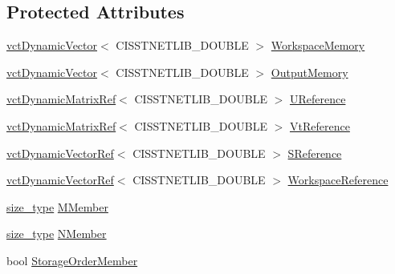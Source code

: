 \subsection*{Protected Attributes}
\begin{DoxyCompactItemize}
\item 
\hyperlink{classvct_dynamic_vector}{vct\+Dynamic\+Vector}$<$ C\+I\+S\+S\+T\+N\+E\+T\+L\+I\+B\+\_\+\+D\+O\+U\+B\+L\+E $>$ \hyperlink{classnmr_s_v_d_economy_dynamic_data_a7e195abf076d992a6c1d4a29ec76be91}{Workspace\+Memory}
\item 
\hyperlink{classvct_dynamic_vector}{vct\+Dynamic\+Vector}$<$ C\+I\+S\+S\+T\+N\+E\+T\+L\+I\+B\+\_\+\+D\+O\+U\+B\+L\+E $>$ \hyperlink{classnmr_s_v_d_economy_dynamic_data_ad990316888e2acec08d79e59a4284fa4}{Output\+Memory}
\end{DoxyCompactItemize}
{\bf }\par
\begin{DoxyCompactItemize}
\item 
\hyperlink{classvct_dynamic_matrix_ref}{vct\+Dynamic\+Matrix\+Ref}$<$ C\+I\+S\+S\+T\+N\+E\+T\+L\+I\+B\+\_\+\+D\+O\+U\+B\+L\+E $>$ \hyperlink{classnmr_s_v_d_economy_dynamic_data_ab6a5af5bd7884ddd590aef7ad83d1194}{U\+Reference}
\item 
\hyperlink{classvct_dynamic_matrix_ref}{vct\+Dynamic\+Matrix\+Ref}$<$ C\+I\+S\+S\+T\+N\+E\+T\+L\+I\+B\+\_\+\+D\+O\+U\+B\+L\+E $>$ \hyperlink{classnmr_s_v_d_economy_dynamic_data_adf2c8ef077330ba421fccf814cfffc58}{Vt\+Reference}
\item 
\hyperlink{classvct_dynamic_vector_ref}{vct\+Dynamic\+Vector\+Ref}$<$ C\+I\+S\+S\+T\+N\+E\+T\+L\+I\+B\+\_\+\+D\+O\+U\+B\+L\+E $>$ \hyperlink{classnmr_s_v_d_economy_dynamic_data_a5f21313bc7280084d7855b4a772960d7}{S\+Reference}
\item 
\hyperlink{classvct_dynamic_vector_ref}{vct\+Dynamic\+Vector\+Ref}$<$ C\+I\+S\+S\+T\+N\+E\+T\+L\+I\+B\+\_\+\+D\+O\+U\+B\+L\+E $>$ \hyperlink{classnmr_s_v_d_economy_dynamic_data_a0f1d57b8c7b8756b73ae5c72e3b2037a}{Workspace\+Reference}
\end{DoxyCompactItemize}

{\bf }\par
\begin{DoxyCompactItemize}
\item 
\hyperlink{classnmr_s_v_d_economy_dynamic_data_aee8ff15f2e92af24fdc3c7f5908770f3}{size\+\_\+type} \hyperlink{classnmr_s_v_d_economy_dynamic_data_a850f29c6d2376c0f87b56b66c0fccfa5}{M\+Member}
\item 
\hyperlink{classnmr_s_v_d_economy_dynamic_data_aee8ff15f2e92af24fdc3c7f5908770f3}{size\+\_\+type} \hyperlink{classnmr_s_v_d_economy_dynamic_data_ae4ce223f5b2cd6171d09810aa08a7a8b}{N\+Member}
\item 
bool \hyperlink{classnmr_s_v_d_economy_dynamic_data_afd61787cd2b1d49a68fe80d55c912f7a}{Storage\+Order\+Member}
\end{DoxyCompactItemize}

